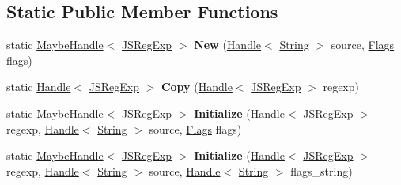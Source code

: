 \subsection*{Static Public Member Functions}
\begin{DoxyCompactItemize}
\item 
static \hyperlink{classv8_1_1internal_1_1_maybe_handle}{Maybe\+Handle}$<$ \hyperlink{classv8_1_1internal_1_1_j_s_reg_exp}{J\+S\+Reg\+Exp} $>$ {\bfseries New} (\hyperlink{classv8_1_1internal_1_1_handle}{Handle}$<$ \hyperlink{classv8_1_1internal_1_1_string}{String} $>$ source, \hyperlink{classv8_1_1base_1_1_flags}{Flags} flags)\hypertarget{classv8_1_1internal_1_1_j_s_reg_exp_aeee2d0771fbae98b9003c2cb92cfe9ed}{}\label{classv8_1_1internal_1_1_j_s_reg_exp_aeee2d0771fbae98b9003c2cb92cfe9ed}

\item 
static \hyperlink{classv8_1_1internal_1_1_handle}{Handle}$<$ \hyperlink{classv8_1_1internal_1_1_j_s_reg_exp}{J\+S\+Reg\+Exp} $>$ {\bfseries Copy} (\hyperlink{classv8_1_1internal_1_1_handle}{Handle}$<$ \hyperlink{classv8_1_1internal_1_1_j_s_reg_exp}{J\+S\+Reg\+Exp} $>$ regexp)\hypertarget{classv8_1_1internal_1_1_j_s_reg_exp_a2b99bd96f29204a62eacba90a635af23}{}\label{classv8_1_1internal_1_1_j_s_reg_exp_a2b99bd96f29204a62eacba90a635af23}

\item 
static \hyperlink{classv8_1_1internal_1_1_maybe_handle}{Maybe\+Handle}$<$ \hyperlink{classv8_1_1internal_1_1_j_s_reg_exp}{J\+S\+Reg\+Exp} $>$ {\bfseries Initialize} (\hyperlink{classv8_1_1internal_1_1_handle}{Handle}$<$ \hyperlink{classv8_1_1internal_1_1_j_s_reg_exp}{J\+S\+Reg\+Exp} $>$ regexp, \hyperlink{classv8_1_1internal_1_1_handle}{Handle}$<$ \hyperlink{classv8_1_1internal_1_1_string}{String} $>$ source, \hyperlink{classv8_1_1base_1_1_flags}{Flags} flags)\hypertarget{classv8_1_1internal_1_1_j_s_reg_exp_a507f1b933f6d7b57d9ee19251588a47b}{}\label{classv8_1_1internal_1_1_j_s_reg_exp_a507f1b933f6d7b57d9ee19251588a47b}

\item 
static \hyperlink{classv8_1_1internal_1_1_maybe_handle}{Maybe\+Handle}$<$ \hyperlink{classv8_1_1internal_1_1_j_s_reg_exp}{J\+S\+Reg\+Exp} $>$ {\bfseries Initialize} (\hyperlink{classv8_1_1internal_1_1_handle}{Handle}$<$ \hyperlink{classv8_1_1internal_1_1_j_s_reg_exp}{J\+S\+Reg\+Exp} $>$ regexp, \hyperlink{classv8_1_1internal_1_1_handle}{Handle}$<$ \hyperlink{classv8_1_1internal_1_1_string}{String} $>$ source, \hyperlink{classv8_1_1internal_1_1_handle}{Handle}$<$ \hyperlink{classv8_1_1internal_1_1_string}{String} $>$ flags\+\_\+string)\hypertarget{classv8_1_1internal_1_1_j_s_reg_exp_a607b6d60769fd3913caa67cf7588855e}{}\label{classv8_1_1internal_1_1_j_s_reg_exp_a607b6d60769fd3913caa67cf7588855e}


\end{DoxyCompactItemize}
